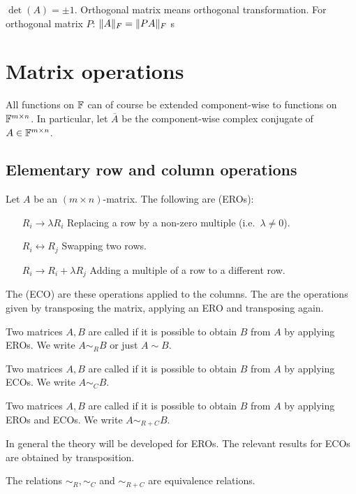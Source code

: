 $\det(A) = \pm 1$. Orthogonal matrix means orthogonal transformation.
For orthogonal matrix $P$: $\lVert A\rVert_F = \lVert PA\rVert_F$
s




\section{Matrix operations}
All functions on $\mathbb{F}$ can of course be extended component-wise to functions on $\mathbb{F}^{m\times n}$. In particular, let $\overline{A}$ be the component-wise complex conjugate of $A\in\mathbb{F}^{m\times n}$.
\subsection{Elementary row and column operations}
\begin{definition}
Let $A$ be an $(m\times n)$-matrix. The following are  (EROs):
\begin{itemize}[leftmargin=3cm]
\item[$\boxed{R_i \to \lambda R_i}$] Replacing a row by a non-zero multiple (i.e.\ $\lambda \neq 0$).
\item[$\boxed{R_i \leftrightarrow R_j}$] Swapping two rows.
\item[$\boxed{R_i \to R_i+ \lambda R_j}$] Adding a multiple of a row to a different row.
\end{itemize}
The  (ECO) are these operations applied to the columns. The are the operations given by transposing the matrix, applying an ERO and transposing again.

Two matrices $A,B$ are called  if it is possible to obtain $B$ from $A$ by applying EROs. We write $A\sim_R B$ or just $A\sim B$.

Two matrices $A,B$ are called  if it is possible to obtain $B$ from $A$ by applying ECOs. We write $A\sim_C B$.

Two matrices $A,B$ are called  if it is possible to obtain $B$ from $A$ by applying EROs and ECOs. We write $A\sim_{R+C} B$.
\end{definition}
In general the theory will be developed for EROs. The relevant results for ECOs are obtained by transposition.

\begin{lemma}
The relations $\sim_R, \sim_C$ and $\sim_{R+C}$ are equivalence relations.
\end{lemma}

